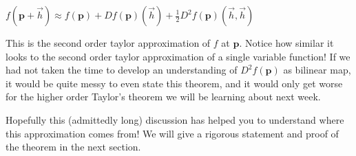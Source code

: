 \documentclass{article}
\begin{document}
\begin{question}
		\begin{theorem}
			\(f(\mathbf{p} + \vec{h}) \approx f(\mathbf{p}) + Df(\mathbf{p})(\vec{h})+ \frac{1}{2} D^2f(\mathbf{p})\left( \vec{h},\vec{h}\right) \)
		\end{theorem}
		
		This is the second order taylor approximation of $f$ at $\mathbf{p}$.   Notice how similar it looks to the second order taylor approximation 
		of a single variable function!  If we had not taken the time to develop an understanding of $D^2f(\mathbf{p})$ as bilinear map, it would be quite messy 
		to even state this theorem, and it would only get worse for the higher order Taylor's theorem we will be learning about next week.
		
		Hopefully this (admittedly long) discussion has helped you to understand where this approximation comes from!  We will give a rigorous statement
		and proof of the theorem in the next section.
		
	\end{question}
\end{document}
